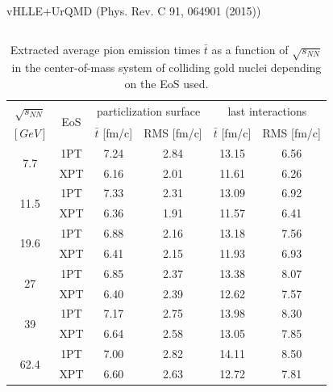 \documentclass[final,hyperref={pdfpagelabels=false}, xcolor=dvipsnames]{beamer}
\begin{document}
\begin{frame}[shrink=30]
\begin{columns}[t]
\begin{block}{vHLLE+UrQMD (Phys. Rev. C 91, 064901 (2015))}
\begin{columns}[t]
\begin{table}[!h]
\caption{Extracted average pion emission times $\bar{t}$ as a function of $\sqrt{s_{NN}}$ in the center-of-mass system of colliding gold nuclei depending on the EoS used.}
\begin{center}
\begin{tabular}{|c|c|c|c|c|c|}\hline
$\sqrt{s_{NN}}$ & \multirow{2}{*}{EoS} & \multicolumn{2}{c|}{particlization surface} & \multicolumn{2}{c|}{last interactions}\\
\cline{3-6} 
$[GeV]$& & $\bar{t}$ [fm/c] &  RMS [fm/c] & $\bar{t}$ [fm/c] & RMS [fm/c]\\
\hline
  \multirow{2}{*}{7.7}     & 1PT     &  7.24 & 2.84 & 13.15    & 6.56    \\
  & XPT   &  6.16 & 2.01 & 11.61    & 6.26 \\
\hline
  \multirow{2}{*}{11.5}       & 1PT     &  7.33 & 2.31 & 13.09    & 6.92    \\
  & XPT  &  6.36 & 1.91  & 11.57   & 6.41   \\
\hline
  \multirow{2}{*}{19.6}       & 1PT     & 6.88 & 2.16 & 13.18     &  7.56  \\
 & XPT  & 6.41 & 2.15 & 11.93    &    6.93  \\
\hline
  \multirow{2}{*}{27}       & 1PT     &   6.85 & 2.37 & 13.38   &  8.07  \\
   & XPT  &    6.40 & 2.39 & 12.62 &    7.57   \\
 \hline
 \multirow{2}{*}{39}        & 1PT     &   7.17 & 2.75 & 13.98   &  8.30   \\
   & XPT  &    6.64 & 2.58 & 13.05 &    7.85   \\
\hline
 \multirow{2}{*}{62.4}        & 1PT     &   7.00 & 2.82 & 14.11   &  8.50  \\
   & XPT  &    6.60 & 2.63 & 12.72 &    7.81 \\     
\hline
\end{tabular}
\end{center}
\end{table}
    
  \end{columns}
 \end{block} 
 

\end{columns}
\end{frame}
\end{document}
